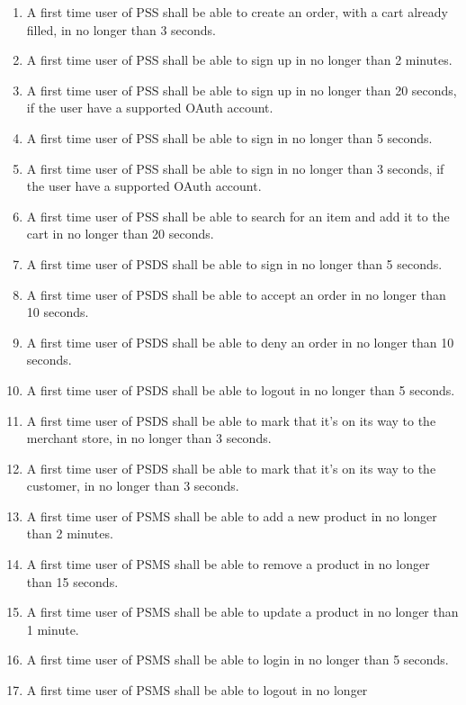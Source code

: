 \begin{enumerate}[label=USE-\arabic*]
    \item A first time user of PSS shall be able to create an order, with a 
    cart already filled, in no longer than 3 seconds.
    \item A first time user of PSS shall be able to sign up in no longer 
    than 2 minutes.
    \item A first time user of PSS shall be able to sign up in no longer 
    than 20 seconds, if the user have a supported OAuth account.
    \item A first time user of PSS shall be able to sign in no longer 
    than 5 seconds.
    \item A first time user of PSS shall be able to sign in no longer 
    than 3 seconds, if the user have a supported OAuth account.
    \item A first time user of PSS shall be able to search for an item and 
    add it to the cart in no longer than 20 seconds.
    \item A first time user of PSDS shall be able to sign in no longer 
    than 5 seconds.
    \item A first time user of PSDS shall be able to accept an order in no 
    longer than 10 seconds.
    \item A first time user of PSDS shall be able to deny an order in no 
    longer than 10 seconds.
    \item A first time user of PSDS shall be able to logout in no longer 
    than 5 seconds.
    \item A first time user of PSDS shall be able to mark that it’s on its 
    way to the merchant store, in no longer than 3 seconds.
    \item A first time user of PSDS shall be able to mark that it’s on its 
    way to the customer, in no longer than 3 seconds.
    \item A first time user of PSMS shall be able to add a new product in 
    no longer than 2 minutes.
    \item A first time user of PSMS shall be able to remove a product in 
    no longer than 15 seconds.
    \item A first time user of PSMS shall be able to update a product in 
    no longer than 1 minute.
    \item A first time user of PSMS shall be able to login in no longer 
    than 5 seconds.
    \item A first time user of PSMS shall be able to logout in no longer 

\end{enumerate}
